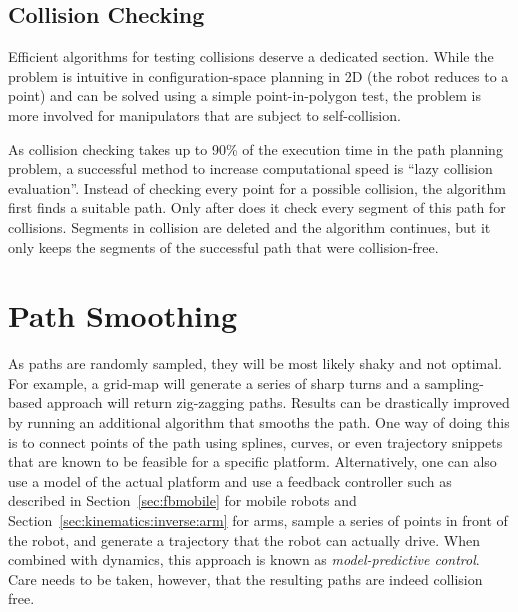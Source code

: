 \subsection{Collision Checking}
Efficient algorithms for testing collisions deserve a dedicated section. While the problem is intuitive in configuration-space planning in 2D (the robot reduces to a point) and can be solved using a simple point-in-polygon test, the problem is more involved for manipulators that are subject to self-collision.

As collision checking takes up to 90\% of the execution time in the path planning problem, a successful method to increase computational speed is ``lazy collision evaluation''. Instead of checking every point for a possible collision, the algorithm first finds a suitable path. Only after does it check every segment of this path for collisions. Segments in collision are deleted and the algorithm continues, but it only keeps the segments of the successful path that were collision-free.

\section{Path Smoothing}
As paths are randomly sampled, they will be most likely shaky and not optimal. For example, a grid-map will generate a series of sharp turns and a sampling-based approach will return zig-zagging paths. Results can be drastically improved by running an additional algorithm that smooths the path. One way of doing this is to connect points of the path using splines, curves, or even trajectory snippets that are known to be feasible for a specific platform. Alternatively, one can also use a model of the actual platform and use a feedback controller such as described in Section~\ref{sec:fbmobile} for mobile robots and Section~\ref{sec:kinematics:inverse:arm} for arms, sample a series of points in front of the robot, and generate a trajectory that the robot can actually drive. When combined with dynamics, this approach is known as \textsl{model-predictive control}. Care needs to be taken, however, that the resulting paths are indeed collision free.

